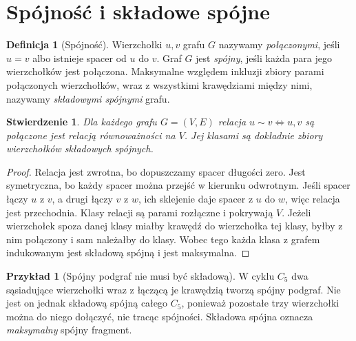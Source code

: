 \documentclass[11pt,a4paper]{report}
\numberwithin{equation}{section}
\theoremstyle{plain}
\newtheorem{stwierdzenie}[twierdzenie]{Stwierdzenie}
\theoremstyle{definition}
\newtheorem{definicja}[twierdzenie]{Definicja}
\newtheorem{przyklad}[twierdzenie]{Przykład}
\theoremstyle{remark}
\begin{document}
\section{Spójność i składowe spójne}
\label{sec:tg-spojnosc}

\begin{definicja}[Spójność]
Wierzchołki $u,v$ grafu $G$ nazywamy
\emph{połączonymi}, jeśli $u=v$ albo istnieje
spacer od $u$ do $v$. Graf $G$ jest \emph{spójny},
jeśli każda para jego wierzchołków jest połączona.
Maksymalne względem inkluzji zbiory parami połączonych
wierzchołków, wraz z wszystkimi krawędziami między nimi,
nazywamy \emph{składowymi spójnymi} grafu.
\end{definicja}

\begin{stwierdzenie}
Dla każdego grafu $G=(V,E)$ relacja
$u\sim v\iff u,v$ są połączone jest relacją
równoważności na $V$. Jej klasami są dokładnie
zbiory wierzchołków składowych spójnych.
\end{stwierdzenie}

\begin{proof}
Relacja jest zwrotna, bo dopuszczamy spacer długości zero.
Jest symetryczna, bo każdy spacer można przejść w kierunku
odwrotnym. Jeśli spacer łączy $u$ z $v$, a drugi łączy
$v$ z $w$, ich sklejenie daje spacer z $u$ do $w$,
więc relacja jest przechodnia. Klasy relacji są
parami rozłączne i pokrywają $V$. Jeżeli wierzchołek
spoza danej klasy miałby krawędź do wierzchołka tej klasy,
byłby z nim połączony i sam należałby do klasy. Wobec
tego każda klasa z grafem indukowanym jest składową
spójną i jest maksymalna.
\end{proof}

\begin{przyklad}[Spójny podgraf nie musi być składową]
W cyklu $C_5$ dwa sąsiadujące wierzchołki wraz z
łączącą je krawędzią tworzą spójny podgraf. Nie jest
on jednak składową spójną całego $C_5$, ponieważ
pozostałe trzy wierzchołki można do niego dołączyć,
nie tracąc spójności. Składowa spójna oznacza
\emph{maksymalny} spójny fragment.
\end{przyklad}

\begin{center}
\end{center}
\end{document}
